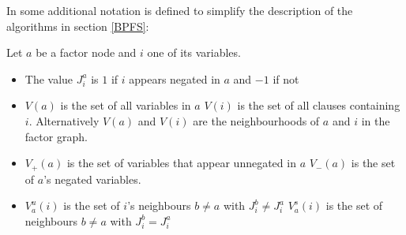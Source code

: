 In \cite{survprob} some additional notation is defined to simplify the description of the algorithms in section \ref{BPFS}: 
\newpage
\begin{definition} Let $a$ be a factor node and $i$ one of its variables.
\begin{itemize}
\item The value $J_i^a$ is $1$ if $i$ appears negated in $a$ and $-1$ if not
\item $V(a)$ is the set of all variables in $a$ \newline$V(i)$ is the set of all clauses containing $i$.  \newline Alternatively $V(a)$ and $V(i)$ are the neighbourhoods of $a$ and $i$ in the factor graph.
\item $V_+(a)$ is the set of variables that appear unnegated in $a$ \newline $V_-(a)$ is the set of $a$'s negated variables.
\item $V_a^u(i)$ is the set of $i$'s neighbours $b \neq a$ with $J_i^b \neq J_i^a$ \newline $V_a^s(i)$ is the set of neighbours $b \neq a$ with $J_i^b = J_i^a$
\end{itemize}
\end{definition}


